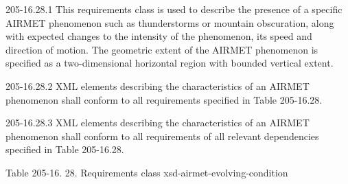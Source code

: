 205-16.28.1 This requirements class is used to describe the presence of a specific AIRMET phenomenon such as thunderstorms or mountain obscuration, along with expected changes to the intensity of the phenomenon, its speed and direction of motion. The geometric extent of the AIRMET phenomenon is specified as a two-dimensional horizontal region with bounded vertical extent.

205-16.28.2 XML elements describing the characteristics of an AIRMET phenomenon shall conform to all requirements specified in Table 205-16.28.

205-16.28.3 XML elements describing the characteristics of an AIRMET phenomenon shall conform to all requirements of all relevant dependencies specified in Table 205-16.28.

Table 205-16. 28. Requirements class xsd-airmet-evolving-condition

